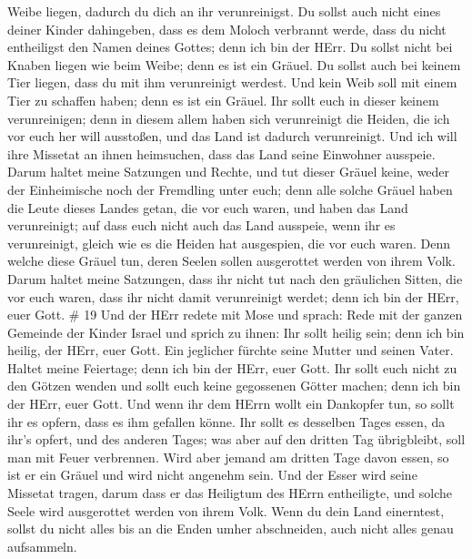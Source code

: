 Weibe liegen, dadurch du dich an ihr verunreinigst.  Du
sollst auch nicht eines deiner Kinder dahingeben, dass es dem Moloch
verbrannt werde, dass du nicht entheiligst den Namen deines Gottes; denn
ich bin der HErr.  Du sollst nicht bei Knaben liegen wie
beim Weibe; denn es ist ein Gräuel.  Du sollst auch bei
keinem Tier liegen, dass du mit ihm verunreinigt werdest. Und kein Weib
soll mit einem Tier zu schaffen haben; denn es ist ein Gräuel.
 Ihr sollt euch in dieser keinem verunreinigen; denn in
diesem allem haben sich verunreinigt die Heiden, die ich vor euch her
will ausstoßen,  und das Land ist dadurch verunreinigt. Und
ich will ihre Missetat an ihnen heimsuchen, dass das Land seine
Einwohner ausspeie.  Darum haltet meine Satzungen und
Rechte, und tut dieser Gräuel keine, weder der Einheimische noch der
Fremdling unter euch;  denn alle solche Gräuel haben die
Leute dieses Landes getan, die vor euch waren, und haben das Land
verunreinigt;  auf dass euch nicht auch das Land ausspeie,
wenn ihr es verunreinigt, gleich wie es die Heiden hat ausgespien, die
vor euch waren.  Denn welche diese Gräuel tun, deren Seelen
sollen ausgerottet werden von ihrem Volk.  Darum haltet
meine Satzungen, dass ihr nicht tut nach den gräulichen Sitten, die vor
euch waren, dass ihr nicht damit verunreinigt werdet; denn ich bin der
HErr, euer Gott. \# 19  Und der HErr redete mit Mose und
sprach:  Rede mit der ganzen Gemeinde der Kinder Israel und
sprich zu ihnen: Ihr sollt heilig sein; denn ich bin heilig, der HErr,
euer Gott.  Ein jeglicher fürchte seine Mutter und seinen
Vater. Haltet meine Feiertage; denn ich bin der HErr, euer Gott.
 Ihr sollt euch nicht zu den Götzen wenden und sollt euch
keine gegossenen Götter machen; denn ich bin der HErr, euer Gott.
 Und wenn ihr dem HErrn wollt ein Dankopfer tun, so sollt
ihr es opfern, dass es ihm gefallen könne.  Ihr sollt es
desselben Tages essen, da ihr's opfert, und des anderen Tages; was aber
auf den dritten Tag übrigbleibt, soll man mit Feuer verbrennen.
 Wird aber jemand am dritten Tage davon essen, so ist er ein
Gräuel und wird nicht angenehm sein.  Und der Esser wird
seine Missetat tragen, darum dass er das Heiligtum des HErrn
entheiligte, und solche Seele wird ausgerottet werden von ihrem Volk.
 Wenn du dein Land einerntest, sollst du nicht alles bis an
die Enden umher abschneiden, auch nicht alles genau aufsammeln.
